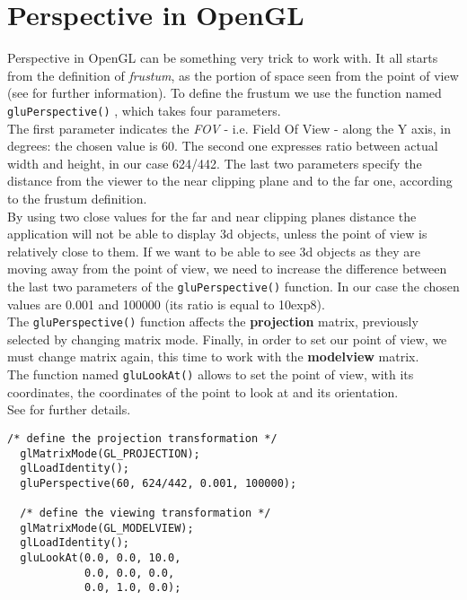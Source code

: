 \section{Perspective in OpenGL}
\label{opengl:perspective}

Perspective in OpenGL can be something very trick to work with. 
It all starts from the definition of \textit{frustum}, as the portion
of space seen from the point of view (see \cite{wiki:frustum} 
for further information). To define the frustum we use the function
named \texttt{gluPerspective()} \cite{opengl:gluPerspective}, which takes 
four parameters.
\\
The first parameter indicates the \textit{FOV} - i.e. Field Of View -
along the Y axis, in degrees: the chosen value is 60. The
second one expresses ratio between actual width and height, 
in our case 624/442. The last two parameters specify the distance 
from the viewer to the near clipping plane and to the far one, 
according to the frustum definition.
\\
By using two close values for the far and near clipping planes 
distance the application will not be able to display 3d
objects, unless the point of view is relatively close to them. 
If we want to be able to see 3d objects as they are moving away
from the point of view, we need to increase the difference between 
the last two parameters of the \texttt{gluPerspective()} function. In
our case the chosen values are 0.001 and 100000 (its ratio is 
equal to 10exp8).
\\
The \texttt{gluPerspective()} function affects the \textbf{projection} 
matrix, previously selected by changing matrix mode. Finally,
in order to set our point of view, we must change matrix again, 
this time to work with the \textbf{modelview} matrix.
\\
The function named
\texttt{gluLookAt()} allows to set the point of view, with its coordinates, 
the coordinates of the point to look at and its orientation.
\\
See \cite{opengl:gluLookAt} for further details.
\\
\begin{lstlisting}[caption={OpenGL perspective example}, label={code:perspective}]
  /* define the projection transformation */
  glMatrixMode(GL_PROJECTION);
  glLoadIdentity();
  gluPerspective(60, 624/442, 0.001, 100000);
  
  /* define the viewing transformation */
  glMatrixMode(GL_MODELVIEW);
  glLoadIdentity();
  gluLookAt(0.0, 0.0, 10.0,
            0.0, 0.0, 0.0,
            0.0, 1.0, 0.0);
\end{lstlisting}

